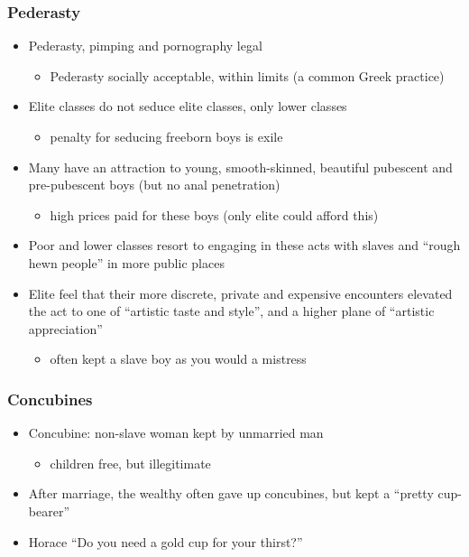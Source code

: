 \documentclass[12pt, twoside]{article}
\begin{document}
\subsubsection{Pederasty}
\begin{itemize}
\item Pederasty, pimping and pornography legal
	\begin{itemize}
	\item Pederasty socially acceptable, within limits (a common Greek practice)
	\end{itemize}
\item Elite classes do not seduce elite classes, only lower classes
	\begin{itemize}
	\item penalty for seducing freeborn boys is exile
	\end{itemize}
\item Many have an attraction to young, smooth-skinned, beautiful pubescent and pre-pubescent boys (but no anal penetration)
	\begin{itemize}
	\item high prices paid for these boys (only elite could afford this)
	\end{itemize}
\item Poor and lower classes resort to engaging in these acts with slaves and “rough hewn people” in more public places
\item Elite feel that their more discrete, private and expensive encounters elevated the act to one of “artistic taste and style”, and a higher plane of “artistic appreciation”
	\begin{itemize}
	\item often kept a slave boy as you would a mistress
	\end{itemize}
\end{itemize}

\subsubsection{Concubines}
\begin{itemize}
\item Concubine: non-slave woman kept by unmarried man
	\begin{itemize}
	\item children free, but illegitimate
	\end{itemize}
\item After marriage, the wealthy often gave up concubines, but kept a “pretty cup-bearer”
\item Horace “Do you need a gold cup for your thirst?”
\end{itemize}
\end{document}
